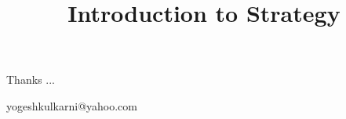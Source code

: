 \documentclass[9pt,xcolor=dvipsnames,compress,t,pdf]{beamer}
\title[\hspace{4cm} \insertframenumber /\inserttotalframenumber]
{Introduction to Strategy}
\begin{document}
\begin{frame}
\titlepage
\end{frame}


\begin{frame}[c]{}
Thanks ...

\vspace{5mm}
yogeshkulkarni@yahoo.com
\end{frame}
\end{document}
